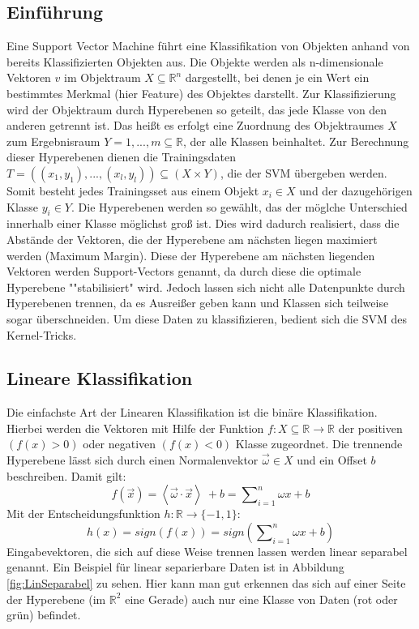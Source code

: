 \subsection{Einführung}
\label{subsec:einfuehrung}
Eine Support Vector Machine führt eine Klassifikation von Objekten anhand von bereits Klassifizierten Objekten aus. Die Objekte werden als n-dimensionale Vektoren $v$ im Objektraum $X \subseteq \mathbb{R}^{n} $ dargestellt, bei denen je ein Wert ein bestimmtes Merkmal (hier Feature) des Objektes darstellt. Zur Klassifizierung wird der Objektraum durch Hyperebenen so geteilt, das jede Klasse von den anderen getrennt ist. Das heißt es erfolgt eine Zuordnung des Objektraumes $X$ zum Ergebnisraum $Y = {1,...,m} \subseteq \mathbb{R}$, der alle Klassen beinhaltet. Zur Berechnung dieser Hyperebenen dienen die Trainingsdaten $T =((x_{1},y_{1}),...,(x_{l},y_{l})) \subseteq (X \times Y)$, die der SVM übergeben werden. Somit besteht jedes Trainingsset aus einem Objekt $x_{i} \in X$ und der dazugehörigen Klasse $y_{i} \in Y$. Die Hyperebenen werden so gewählt, das der möglche Unterschied innerhalb einer Klasse möglichst groß ist. Dies wird dadurch realisiert, dass die Abstände der Vektoren, die der Hyperebene am nächsten liegen maximiert werden (Maximum Margin). Diese der Hyperebene am nächsten liegenden Vektoren werden Support-Vectors genannt, da durch diese die optimale Hyperebene ""stabilisiert" wird. Jedoch lassen sich nicht alle Datenpunkte durch Hyperebenen trennen, da es Ausreißer geben kann und Klassen sich teilweise sogar überschneiden. Um diese Daten zu klassifizieren, bedient sich die SVM des Kernel-Tricks.\cite{laechele-svm}

\subsection{Lineare Klassifikation}
\label{subsec:lineare-klassifikation}
Die einfachste Art der Linearen Klassifikation ist die binäre Klassifikation. Hierbei werden die Vektoren mit Hilfe der Funktion $ f: X \subseteq \mathbb{R} \rightarrow \mathbb{R} $ der positiven $ (f(x)>0) $ oder negativen $ (f(x)<0) $ Klasse zugeordnet. Die trennende Hyperebene lässt sich durch einen Normalenvektor $\vec{\omega} \in X$ und ein Offset $b$ beschreiben.
Damit gilt:\[ f(\vec{x})=\left\langle \vec{\omega} \cdot \vec{x} \right\rangle\ + b = \sum\nolimits_{i=1}^n \omega x + b \]
Mit der Entscheidungsfunktion $h : \mathbb{R} \rightarrow \{-1,1\}$:
\[ h(x) = sign(f(x)) = sign (\sum\nolimits_{i=1}^n \omega x + b)\]
Eingabevektoren, die sich auf diese Weise trennen lassen werden linear separabel genannt. Ein Beispiel für linear separierbare Daten ist in Abbildung \ref{fig:LinSeparabel} zu sehen. Hier kann man gut erkennen das sich auf einer Seite der Hyperebene (im $\mathbb{R}^2$ eine Gerade) auch nur eine Klasse von Daten (rot oder grün) befindet.

